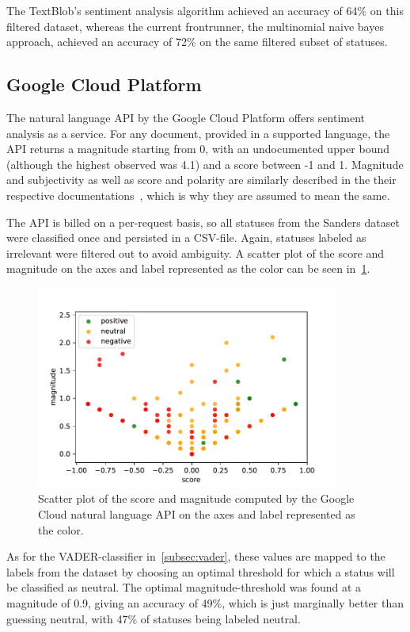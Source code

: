 The TextBlob's sentiment analysis algorithm achieved an accuracy of 64\% on this filtered dataset,
whereas the current frontrunner, the multinomial naive bayes approach,
achieved an accuracy of 72\% on the same filtered subset of statuses.

\subsection{Google Cloud Platform}
\label{subsec:googlecloud}

The natural language API by the Google Cloud Platform offers sentiment analysis as a service.
For any document, provided in a supported language, the API returns a magnitude starting from 0, with an undocumented upper bound
(although the highest observed was 4.1) and a score between -1 and 1.
Magnitude and subjectivity as well as score and polarity are similarly described in the their respective documentations~\cite{gcloudDocs}\cite{textblobDocs},
which is why they are assumed to mean the same.
\par
The API is billed on a per-request basis, so all statuses from the Sanders dataset were classified once and persisted in a CSV-file.
Again, statuses labeled as irrelevant were filtered out to avoid ambiguity.
A scatter plot of the score and magnitude on the axes and label represented as the color can be seen in~\ref{fig:gcloud}.

\begin{figure}
    \centering
    \caption{Scatter plot of the score and magnitude computed by the Google Cloud natural language API on the axes and label represented as the color.}
    \label{fig:gcloud}
    \includegraphics[width=10cm]{../figures/gcloud.pdf}
\end{figure}

As for the VADER-classifier in~\ref{subsec:vader}, these values are mapped to the labels from the dataset by
choosing an optimal threshold for which a status will be classified as neutral.
The optimal magnitude-threshold was found at a magnitude of 0.9, giving an accuracy of 49\%,
which is just marginally better than guessing neutral, with 47\% of statuses being labeled neutral.

